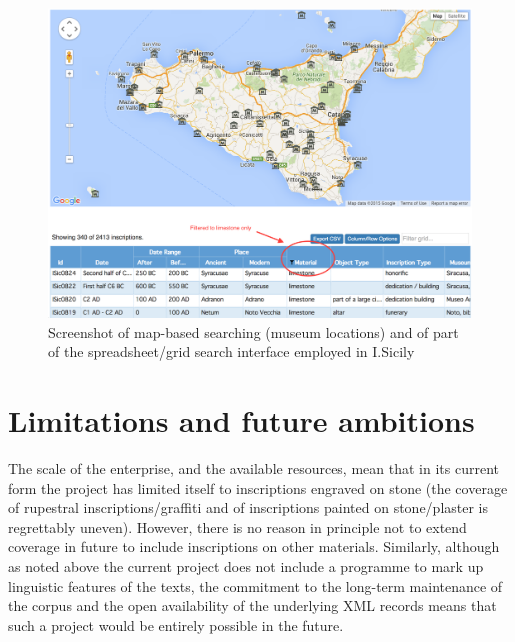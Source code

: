 \documentclass[amsthm,ebook]{saparticle}
\begin{document}
\begin{figure}[!bp]
\centering
 \includegraphics[width=\columnwidth]{EAGLE2016ISicilyfinalcopy-img002.png}
\caption{Screenshot of map-based searching (museum locations) and of part of the spreadsheet/grid search interface
employed in I.Sicily}
\label{fig:2}
\end{figure}
 



\section{Limitations and future ambitions}


The scale of the enterprise, and the available resources, mean that in its current form the project has limited itself
to inscriptions engraved on stone (the coverage of rupestral inscriptions/graffiti and of inscriptions painted on
stone/plaster is regrettably uneven). However, there is no reason in principle not to extend coverage in future to
include inscriptions on other materials. Similarly, although as noted above the current project does not include a
programme to mark up linguistic features of the texts, the commitment to the long-term maintenance of the corpus and
the open availability of the underlying XML records means that such a project would be entirely possible in the future.
\end{document}

